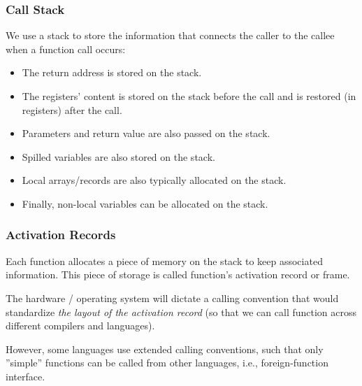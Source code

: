 \documentclass{beamer}
\renewcommand{\emph}[1]{\textcolor{structure}{#1}}
\newcommand{\emp}[1]{\textcolor{DikuRed}{ #1}}
\begin{document}
\begin{frame}[fragile,t]
   \frametitle{Call Stack}

\bigskip

We use a stack to store the information that connects the 
caller to the callee when a function call occurs:


\bigskip

\begin{itemize}

    \item \emp{The return address} is stored on the stack.\bigskip

    \item \emp{The registers' content} is stored on the stack before the call and
            is restored (in registers) after the call.\bigskip

    \item \emp{Parameters and return value} are also passed on the stack.\bigskip

    \item \emp{Spilled variables} are also stored on the stack.\bigskip

    \item \emp{Local arrays/records} are also typically allocated on the stack.\bigskip

    \item Finally, \emp{non-local variables} can be allocated on the stack.

\end{itemize}


\end{frame}




\begin{frame}[fragile,t]
   \frametitle{Activation Records}

\bigskip

Each function allocates a piece of memory on the stack to keep
associated information. This piece of storage is called 
function's \emp{activation record} or \emp{frame}.


\bigskip


The hardware / operating system will dictate a calling convention
that would standardize \emph{\em the layout of the activation record} 
(so that we can call function across different compilers and languages).


\bigskip


However, some languages use extended calling conventions, such that
only ''simple'' functions can be called from other languages, i.e.,
foreign-function interface.

\end{frame}
\end{document}
